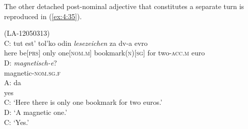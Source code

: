 The other detached post-nominal adjective that constitutes a separate turn is reproduced in (\ref{ex:4:35}).

\ea
\label{ex:4:35}
(LA-12050313)\\
\gll C: tut est' tol'ko odin \textit{lesezeichen}  za dv-a evro\\
	{} here be[\textsc{prs}] only one[\textsc{nom.m}] bookmark(\textsc{n})[\textsc{sg}] for two-\textsc{acc.m} euro \\
\glt
\gll D: {\textit{magnetisch-e}?}\\
	{} magnetic-\textsc{nom.sg.f} \\
\glt  
\gll A: da\\
	{} yes\\
\glt 
C: `Here there is only one bookmark for two euros.'\\
D: `A magnetic one.'\\
C: `Yes.'\\
\z

